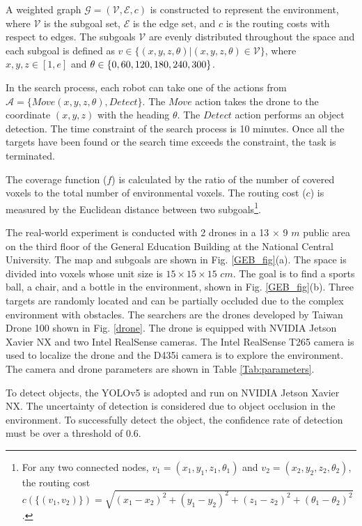 A weighted graph $\mathcal{G}=(\mathcal{V}, \mathcal{E}, c)$ is constructed to represent the environment, where $\mathcal{V}$ is the subgoal set, $\mathcal{E}$ is the edge set, and $c$ is the routing costs with respect to edges.
The subgoals $\mathcal{V}$ are evenly distributed throughout the space and each subgoal is defined as $v\in \{(x,y,z,\theta)|(x,y,z,\theta)\in \mathcal{V}\}$, where $x,y,z\in[1, e]$ and $\theta\in\{0,60,120,180, \\ 240,300\}$.

In the search process, each robot can take one of the actions from $\mathcal{A}=\{Move(x,y,z,\theta), Detect\}$.
The $Move$ action takes the drone to the coordinate $(x,y,z)$ with the heading $\theta$.
The $Detect$ action performs an object detection.
The time constraint of the search process is 10 minutes.
Once all the targets have been found or the search time exceeds the constraint, the task is terminated.

The coverage function ($f$) is calculated by the ratio of the number of covered voxels to the total number of environmental voxels. The routing cost ($c$) is measured by the Euclidean distance between two subgoals\footnote{For any two connected nodes, $v_1=(x_1,y_1,z_1, \theta_1)$ and $v_2=(x_2,y_2,z_2,\theta_2)$, the routing cost $c(\{(v_1,v_2)\})=\sqrt{(x_1-x_2)^2+(y_1-y_2)^2+(z_1-z_2)^2+(\theta_1-\theta_2)^2}$.}.

The real-world experiment is conducted with 2 drones in a 13 $\times$ 9 $m$ public area on the third floor of the General Education Building at the National Central University. The map and subgoals are shown in Fig. \ref{GEB_fig}(a). The space is divided into voxels whose unit size is $15 \times 15 \times 15$ $cm$.
The goal is to find a sports ball, a chair, and a bottle in the environment, shown in Fig. \ref{GEB_fig}(b). Three targets are randomly located and can be partially occluded due to the complex environment with obstacles.
The searchers are the drones developed by Taiwan Drone 100 shown in Fig. \ref{drone}.
The drone is equipped with NVIDIA Jetson Xavier NX and two Intel RealSense cameras.
The Intel RealSense T265 camera is used to localize the drone and the D435i camera is to explore the environment.
The camera and drone parameters are shown in Table \ref{Tab:parameters}.

To detect objects, the YOLOv5 \cite{glenn_jocher_2022_7347926} is adopted and run on NVIDIA Jetson Xavier NX.
The uncertainty of detection is considered due to object occlusion in the environment. To successfully detect the object, the confidence rate of detection must be over a threshold of 0.6.

